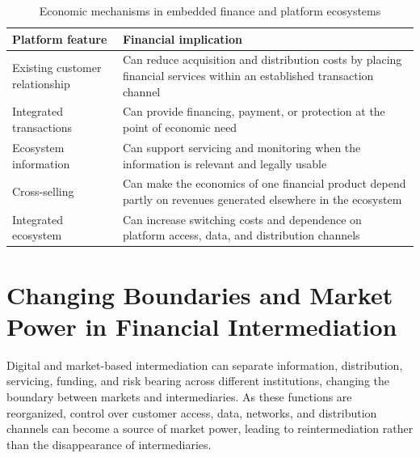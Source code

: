 \begin{table}[H]

\centering

\caption{Economic mechanisms in embedded finance and platform ecosystems}

\label{tab:ch16-embedded-finance-ecosystems}

\begin{tabularx}{0.92\textwidth}{@{}p{} X@{}}

\toprule

\textbf{Platform feature} & \textbf{Financial implication} \\

\midrule

Existing customer relationship
& Can reduce acquisition and distribution costs by placing financial services within an established transaction channel \\

Integrated transactions
& Can provide financing, payment, or protection at the point of economic need \\

Ecosystem information
& Can support servicing and monitoring when the information is relevant and legally usable \\

Cross-selling
& Can make the economics of one financial product depend partly on revenues generated elsewhere in the ecosystem \\

Integrated ecosystem
& Can increase switching costs and dependence on platform access, data, and distribution channels \\

\bottomrule

\end{tabularx}

\end{table}

\section[Changing Boundaries and Market Power in Financial Intermediation]{Changing Boundaries and Market Power in Financial Intermediation}

Digital and market-based intermediation can separate information, distribution, servicing, funding, and risk bearing across different institutions, changing the boundary between markets and intermediaries. As these functions are reorganized, control over customer access, data, networks, and distribution channels can become a source of market power, leading to reintermediation rather than the disappearance of intermediaries.

